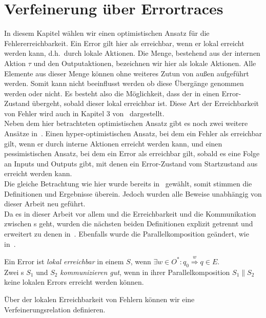 \chapter{Verfeinerung über Errortraces}

In diesem Kapitel wählen wir einen optimistischen Ansatz für die
Fehlererreichbarkeit. Ein Error gilt hier als erreichbar, wenn er lokal
erreicht werden kann, d.h.\ durch lokale Aktionen. Die Menge, bestehend aus der
internen Aktion $\tau$ und den Outputaktionen, bezeichnen wir hier als lokale
Aktionen. Alle Elemente aus dieser Menge können ohne
weiteres Zutun von außen aufgeführt werden. Somit kann nicht beeinflusst werden ob diese
Übergänge genommen werden oder nicht. Es besteht also die Möglichkeit, dass
der \EIO{} in einen Error-Zustand übergeht, sobald dieser lokal erreichbar ist. Diese
Art der Erreichbarkeit von Fehler wird auch in Kapitel 3 von~\cite{Vogler2014EIO}
dargestellt.\\
Neben dem hier betrachteten optimistischen Ansatz gibt es noch zwei weitere
Ansätze in~\cite{Vogler2014EIO}. Einen hyper-optimistischen Ansatz, bei dem ein
Fehler als erreichbar gilt, wenn er durch interne Aktionen erreicht werden
kann, und einen pessimistischen Ansatz, bei dem ein Error als erreichbar gilt,
sobald es eine Folge an Inputs und Outputs gibt, mit denen ein Error-Zustand
vom Startzustand aus erreicht werden kann.\\
Die gleiche Betrachtung wie hier wurde bereits in~\cite{Schlosser2012BA} gewählt, somit
stimmen die Definitionen und Ergebnisse überein. Jedoch wurden alle Beweise unabhängig von
dieser Arbeit neu geführt.\\
Da es in dieser Arbeit vor allem und die Erreichbarkeit und die Kommunikation
zwischen \EIO{}s geht, wurden die nächsten beiden Definitionen explizit getrennt
und erweitert zu denen in~\cite{Vogler2014EIO}. Ebenfalls wurde die
Parallelkomposition geändert, wie in~\cite{Schlosser2012BA}.

\begin{Def}
  Ein Error ist \emph{lokal erreichbar} in einem \EIO{} $S$, wenn $\exists w\in O^*: q_0
  \overset{w}{\Rightarrow} q\in E$.\\
  Zwei \EIO{}s $S_1$ und $S_2$ \emph{kommunizieren gut}, wenn in ihrer
  Parallelkomposition $S_1\| S_2$ keine lokalen Errors erreicht werden können.
\end{Def}

Über der lokalen Erreichbarkeit von Fehlern können wir eine
Verfeinerungsrelation definieren.

